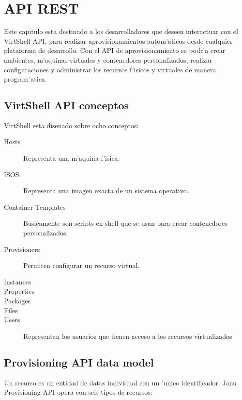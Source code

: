 \chapter{API REST}
\label{capapi}

Este capitulo esta destinado a los desarrolladores que deseen interactuar con el VirtShell API, para realizar aprovisionamientos autom'aticos desde cualquier plataforma de desarrollo. Con el API de aprovisionamiento se podr'a crear ambientes, m'aquinas virtuales y contenedores personalizados, realizar configuraciones y administrar los recursos f'isicos y virtuales de manera program'atica. 

\section{VirtShell API conceptos}
VirtShell esta disenado sobre ocho conceptos:

\begin{description}
\item [Hosts] Representa una m'aquina f'isica.
\item [ISOS] Representa una imagen exacta de un sistema operativo.
\item [Container Templates] Basicamente son scripts en shell que se usan para crear contenedores personalizados.
\item [Provisioners] Permiten configurar un recurso virtual.
\item [Instances] 
\item [Properties]
\item [Packages]
\item [Files]
\item [Users] Representan los usuarios que tienen acceso a los recursos virtualizados
\end{description}




\section{Provisioning API data model}
Un recurso es un entidad de datos individual con un 'unico identificador. Janu Provisioning API opera con seis tipos de recursos:

